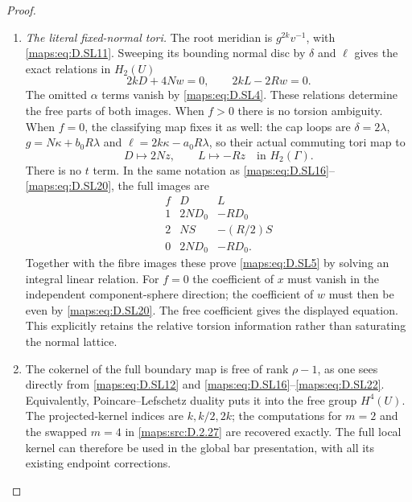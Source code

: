 \begin{proof}
\begin{enumerate}[label=\arabic*.,leftmargin=*]
\item \emph{The literal fixed-normal tori.}
The root meridian is $g^{2k}v^{-1}$,
with \eqref{maps:eq:D.SL11}. Sweeping its bounding
normal disc by $\delta$ and $\ell$ gives
the exact relations in $H_2(U)$
\[
                 2kD+4Nw=0,\qquad
                             2kL-2Rw=0.                  \tag{D.SL21}\label{maps:eq:D.SL21}
\]
The omitted $\alpha$ terms vanish by
\eqref{maps:eq:D.SL4}. These relations determine the
free parts of both images. When $f>0$
there is no torsion ambiguity. When $f=0$,
the classifying map fixes it as well:
the cap loops are $\delta=2\lambda$,
$g=N\kappa+b_0R\lambda$ and
$\ell=2k\kappa-a_0R\lambda$, so their
actual commuting tori map to
\[
                 D\mapsto2Nz,\qquad L\mapsto-Rz
                            \quad\text{in }H_2(\Gamma).
\]
There is no $t$ term. In the same notation
as \eqref{maps:eq:D.SL16}--\eqref{maps:eq:D.SL20}, the full images are
\[
\begin{array}{c|c|c}
f&D&L\\\hline
1&2ND_0&-RD_0\\
2&NS&-(R/2)S\\
0&2ND_0&-RD_0.
\end{array}                                               \tag{D.SL22}\label{maps:eq:D.SL22}
\]
Together with the fibre images these
prove \eqref{maps:eq:D.SL5} by solving an integral
linear relation. For $f=0$ the coefficient
of $x$ must vanish in the independent
component-sphere direction; the coefficient
of $w$ must then be even by \eqref{maps:eq:D.SL20}.
The free coefficient gives the displayed
equation. This explicitly retains the
relative torsion information rather than
saturating the normal lattice.

\item The cokernel of the full boundary map is
free of rank $\rho-1$, as one sees directly
from \eqref{maps:eq:D.SL12} and \eqref{maps:eq:D.SL16}--\eqref{maps:eq:D.SL22}.
Equivalently, Poincare--Lefschetz duality
puts it into the free group $H^4(U)$.
The projected-kernel indices are $k,k/2,2k$;
the computations for $m=2$ and the swapped
$m=4$ in \ref{maps:src:D.2.27} are recovered exactly.
The full local kernel can therefore be
used in the global bar presentation,
with all its existing endpoint corrections.


\end{enumerate}
\end{proof}
